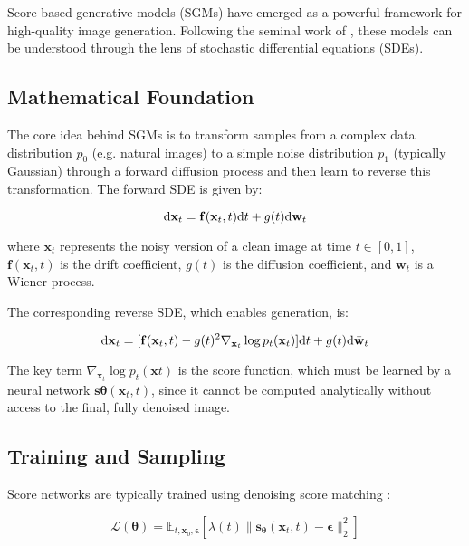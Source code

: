Score-based generative models (SGMs) have emerged as a powerful framework for high-quality image generation. Following the seminal work of \cite{song2021scorebasedgenerativemodelingstochastic}, these models can be understood through the lens of stochastic differential equations (SDEs).

\subsection{Mathematical Foundation}

The core idea behind SGMs is to transform samples from a complex data distribution $p_0$ (e.g. natural images) to a simple noise distribution $p_1$ (typically Gaussian) through a forward diffusion process and then learn to reverse this transformation. The forward SDE is given by:

\begin{equation}
\mathrm{d} \mathbf{x}_t = \mathbf{f}(\mathbf{x}_t, t) \mathrm{d} t + g(t) \mathrm{d} \mathbf{w}_t
\label{eq:forward_sde}
\end{equation}

where $\mathbf{x}_t$ represents the noisy version of a clean image at time $t \in [0, 1]$, $\mathbf{f}(\mathbf{x}_t, t)$ is the drift coefficient, $g(t)$ is the diffusion coefficient, and $\mathbf{w}_t$ is a Wiener process.

The corresponding reverse SDE, which enables generation, is:

\begin{equation}
\mathrm{d} \mathbf{x}_t = [\mathbf{f}(\mathbf{x}_t, t) - g(t)^2 \nabla_{\mathbf{x}_t} \log p_t(\mathbf{x}_t)] \mathrm{d} t + g(t) \mathrm{d} \bar{\mathbf{w}}_t
\label{eq:reverse_sde}
\end{equation}

The key term $\nabla_{\mathbf{x}_t} \log p_t(\mathbf{x}t)$ is the score function, which must be learned by a neural network $\mathbf{s}{\boldsymbol{\theta}}(\mathbf{x}_t, t)$, since it cannot be computed analytically without access to the final, fully denoised image.

\subsection{Training and Sampling}

Score networks are typically trained using denoising score matching \citep{6795935, song2020generativemodelingestimatinggradients}:

\begin{equation}
\mathcal{L}(\boldsymbol{\theta}) = \mathbb{E}_{t, \mathbf{x}_0, \boldsymbol{\epsilon}} \left[ \lambda(t) \|\mathbf{s}_{\boldsymbol{\theta}}(\mathbf{x}_t, t) - \boldsymbol{\epsilon}\|_2^2 \right]
\label{eq:score_matching_loss}
\end{equation}

